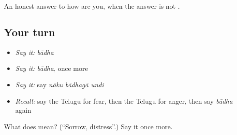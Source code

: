 \begin{grammarlens}[title={What you've built}]
An honest answer to how are you, when the answer is not .
\end{grammarlens}

\subsection*{Your turn}
\begin{itemize}
\raggedright
  \item \emph{Say it:} \emph{bādha}
  \item \emph{Say it:} \emph{bādha}, once more
  \item \emph{Say it:} say \emph{nāku bādhagā undi}
  \item \emph{Recall:} say the Telugu for fear, then the Telugu for anger, then say \emph{bādha} again
\end{itemize}

\begin{tcolorbox}[breakable,colback=teal!4,colframe=teal!35!black,title={Before you move on}]
What does  mean? (\textquotedblleft{}Sorrow, distress\textquotedblright{}.) Say it once more.
\end{tcolorbox}
